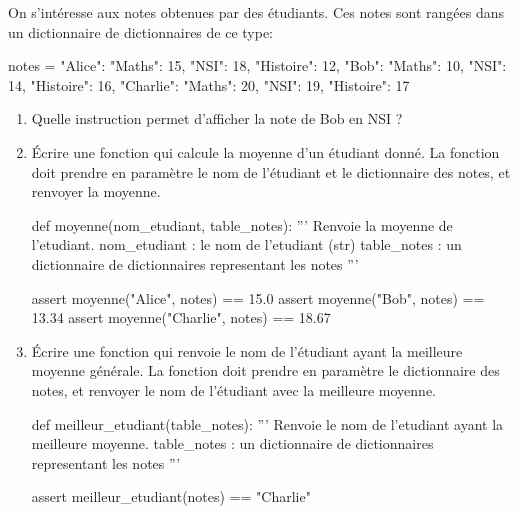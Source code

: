 \documentclass[11pt, a4paper]{report}
\def\ptsexoE{2}
\begin{document}
\exods{\ptsexoE} \medskip

On s'intéresse aux notes obtenues par des étudiants. Ces notes sont rangées dans un dictionnaire de dictionnaires de ce type:

\begin{CodePythontexAlt}[TaillePolice=\large, Largeur=1\linewidth,Centre,Lignes=true,PremLigne=1]{}
notes = {
    "Alice": {"Maths": 15, "NSI": 18, "Histoire": 12},
    "Bob": {"Maths": 10, "NSI": 14, "Histoire": 16},
    "Charlie": {"Maths": 20, "NSI": 19, "Histoire": 17}
}
\end{CodePythontexAlt}

\begin{enumerate}
    \item Quelle instruction permet d'afficher la note de Bob en NSI ? \hfill {}
    \item Écrire une fonction qui calcule la moyenne d'un étudiant donné. La fonction doit prendre en paramètre le nom de l'étudiant et le dictionnaire des notes, et renvoyer la moyenne.
    
\begin{CodePythontexAlt}[TaillePolice=\large, Largeur=1\linewidth,Centre,Lignes=false,PremLigne=1]{}
    def moyenne(nom_etudiant, table_notes):
        ''' Renvoie la moyenne de l'etudiant.
        nom_etudiant : le nom de l'etudiant (str)
        table_notes : un dictionnaire de dictionnaires representant les notes
        '''











    assert moyenne("Alice", notes) == 15.0
    assert moyenne("Bob", notes) == 13.34
    assert moyenne("Charlie", notes) == 18.67
    \end{CodePythontexAlt}
    \item Écrire une fonction qui renvoie le nom de l'étudiant ayant la meilleure moyenne générale. La fonction doit prendre en paramètre le dictionnaire des notes, et renvoyer le nom de l'étudiant avec la meilleure moyenne.
    
    \begin{CodePythontexAlt}[TaillePolice=\large, Largeur=1\linewidth,Centre,Lignes=false,PremLigne=1]{}
    def meilleur_etudiant(table_notes):
        ''' Renvoie le nom de l'etudiant ayant la meilleure moyenne.
        table_notes : un dictionnaire de dictionnaires representant les notes
        '''








    assert meilleur_etudiant(notes) == "Charlie"
    \end{CodePythontexAlt}

    
\end{enumerate}
\end{document}
